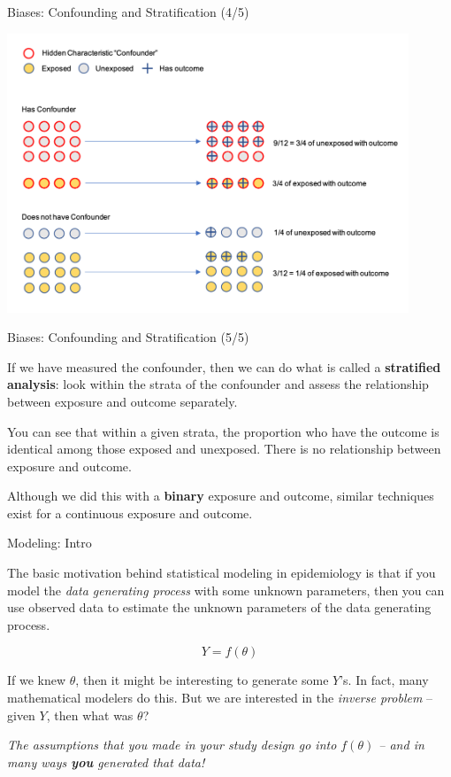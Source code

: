 \documentclass[ignorenonframetext,]{beamer}
\begin{document}
\begin{frame}{Biases: Confounding and Stratification (4/5)}
\protect\hypertarget{biases-confounding-and-stratification-45}{}

\includegraphics[width=0.9\textwidth,height=\textheight]{../media/confounder-3.png}

\end{frame}

\begin{frame}{Biases: Confounding and Stratification (5/5)}
\protect\hypertarget{biases-confounding-and-stratification-55}{}

If we have measured the confounder, then we can do what is called a
\textbf{stratified analysis}: look within the strata of the confounder
and assess the relationship between exposure and outcome separately.

You can see that within a given strata, the proportion who have the
outcome is identical among those exposed and unexposed. There is no
relationship between exposure and outcome.

Although we did this with a \textbf{binary} exposure and outcome,
similar techniques exist for a continuous exposure and outcome.

\end{frame}

\begin{frame}{Modeling: Intro}
\protect\hypertarget{modeling-intro}{}

The basic motivation behind statistical modeling in epidemiology is that
if you model the \emph{data generating process} with some unknown
parameters, then you can use observed data to estimate the unknown
parameters of the data generating process.

\[
Y = f(\theta)
\]

If we knew \(\theta\), then it might be interesting to generate some
\(Y\)'s. In fact, many mathematical modelers do this. But we are
interested in the \emph{inverse problem} -- given \(Y\), then what was
\(\theta\)?

\emph{The assumptions that you made in your study design go into
\(f(\theta)\) -- and in many ways \textbf{you} generated that data!}

\end{frame}
\end{document}
